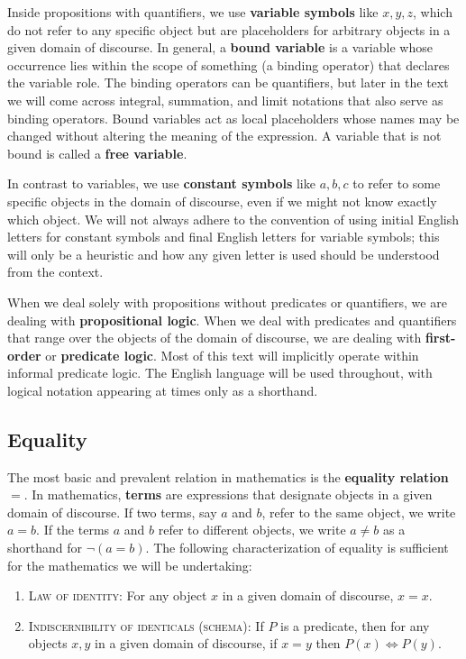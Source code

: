 Inside propositions with quantifiers, we use \textbf{variable symbols} like $x, y, z$, which do not refer to any specific object but are placeholders for arbitrary objects in a given domain of discourse.
In general, a \textbf{bound variable} is a variable whose occurrence lies within the scope of something (a binding operator) that declares the variable role.
The binding operators can be quantifiers, but later in the text we will come across integral, summation, and limit notations that also serve as binding operators. 
Bound variables act as local placeholders whose names may be changed without altering the meaning of the expression.
A variable that is not bound is called a \textbf{free variable}. 

In contrast to variables, we use \textbf{constant symbols} like $a, b, c$ to refer to some specific objects in the domain of discourse, even if we might not know exactly which object. 
We will not always adhere to the convention of using initial English letters for constant symbols and final English letters for variable symbols; this will only be a heuristic and how any given letter is used should be understood from the context. 

When we deal solely with propositions without predicates or quantifiers, we are dealing with \textbf{propositional logic}.
When we deal with predicates and quantifiers that range over the objects of the domain of discourse, we are dealing with \textbf{first-order} or \textbf{predicate logic}. 
Most of this text will implicitly operate within informal predicate logic. 
The English language will be used throughout, with logical notation appearing at times only as a shorthand.

\subsection{Equality}

The most basic and prevalent relation in mathematics is the \textbf{equality relation} $=$.
In mathematics, \textbf{terms} are expressions that designate objects in a given domain of discourse.
If two terms, say $a$ and $b$, refer to the same object, we write $a = b$. 
If the terms $a$ and $b$ refer to different objects, we write $a\ne b$ as a shorthand for $\neg (a = b)$. 
The following characterization of equality is sufficient for the mathematics we will be undertaking:

\begin{enumerate}[itemsep=-0.4ex, label=(\arabic*)]
	\item \textsc{Law of identity:} For any object $x$ in a given domain of discourse, $x = x$. 
	\item \textsc{Indiscernibility of identicals (schema):} If $P$ is a predicate, then for any objects $x, y$ in a given domain of discourse, if $x = y$ then $P(x) \iff P(y)$.
\end{enumerate}

